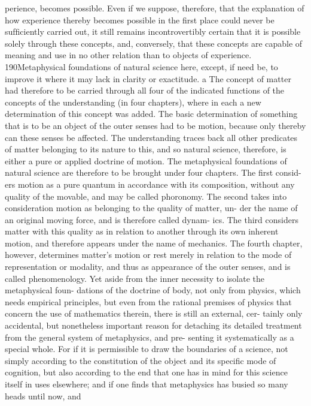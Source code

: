 perience, becomes possible. Even if we suppose, therefore, that the explanation
of how experience thereby becomes possible in the ﬁrst place could never be
sufﬁciently carried out, it still remains incontrovertibly certain that it is possible
solely through these concepts, and, conversely, that these concepts are capable
of meaning and use in no other relation than to objects of experience.
190Metaphysical foundations of natural science
here, except, if need be, to improve it where it may lack in clarity or
exactitude. a
The concept of matter had therefore to be carried through all four
of the indicated functions of the concepts of the understanding (in four
chapters), where in each a new determination of this concept was added.
The basic determination of something that is to be an object of the
outer senses had to be motion, because only thereby can these senses be
affected. The understanding traces back all other predicates of matter
belonging to its nature to this, and so natural science, therefore, is either a
pure or applied doctrine of motion. The metaphysical foundations of natural
science are therefore to be brought under four chapters. The ﬁrst consid-
ers motion as a pure quantum in accordance with its composition, without
any quality of the movable, and may be called phoronomy. The second
takes into consideration motion as belonging to the quality of matter, un-
der the name of an original moving force, and is therefore called dynam-
ics. The third considers matter with this quality as in relation to another
through its own inherent motion, and therefore appears under the name
of mechanics. The fourth chapter, however, determines matter’s motion
or rest merely in relation to the mode of representation or modality, and
thus as appearance of the outer senses, and is called phenomenology.
Yet aside from the inner necessity to isolate the metaphysical foun-
dations of the doctrine of body, not only from physics, which needs
empirical principles, but even from the rational premises of physics that
concern the use of mathematics therein, there is still an external, cer-
tainly only accidental, but nonetheless important reason for detaching
its detailed treatment from the general system of metaphysics, and pre-
senting it systematically as a special whole. For if it is permissible to draw
the boundaries of a science, not simply according to the constitution of
the object and its speciﬁc mode of cognition, but also according to the
end that one has in mind for this science itself in uses elsewhere; and
if one ﬁnds that metaphysics has busied so many heads until now, and
